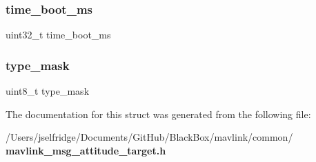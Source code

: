 \subsubsection{time\+\_\+boot\+\_\+ms}
{\footnotesize\ttfamily uint32\+\_\+t time\+\_\+boot\+\_\+ms}

\mbox{\label{struct____mavlink__attitude__target__t_a7a7eaf3ba78794189eb812cc1c67b27c}} 
\subsubsection{type\+\_\+mask}
{\footnotesize\ttfamily uint8\+\_\+t type\+\_\+mask}



The documentation for this struct was generated from the following file\+:\begin{DoxyCompactItemize}
\item 
/\+Users/jselfridge/\+Documents/\+Git\+Hub/\+Black\+Box/mavlink/common/\textbf{ mavlink\+\_\+msg\+\_\+attitude\+\_\+target.\+h}\end{DoxyCompactItemize}
